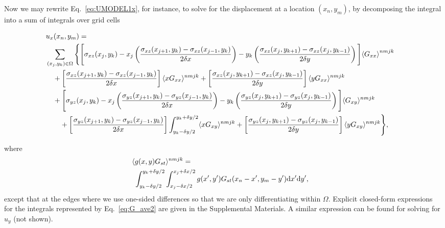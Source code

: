 \documentclass[aps,prl,reprint,twocolumn,groupedaddress,showpacs]{revtex4-1}
\def\dd{\mbox{d}}
\begin{document}
Now we may rewrite Eq.~\ref{eq:UMODEL1x}, for instance, to solve for the displacement at a location $(x_n,y_m)$, by decomposing the integral into a sum of integrals over grid cells
%
\begin{widetext}
\begin{align}
 \lefteqn{u_x(x_n,y_m) =} \nonumber\\
 & \sum_{(x_j,y_k)\in\Omega} \Bigg\{ \Bigg[\sigma_{xz}(x_j,y_k)  - x_j\left(\frac{\sigma_{xz}(x_{j+1},y_k) - \sigma_{xz}(x_{j-1},y_k) }{2\delta x }    \right)    -y_k\left( \frac{\sigma_{xz}(x_j,y_{k+1}) -  \sigma_{xz}(x_j,y_{k-1}) }{2\delta y}\right) \Bigg]{ \langle G_{xx} \rangle}^{nmjk} \nonumber \\
&\quad+\left[ \frac{\sigma_{xz}(x_{j+1},y_k) -  \sigma_{xz}(x_{j-1},y_k) }{2\delta x}   \right]\langle xG_{xx} \rangle^{nmjk} + \left[  \frac{\sigma_{xz}(x_j,y_{k+1}) - \sigma_{xz}(x_j,y_{k-1}) }{2\delta y} \right] \langle yG_{xx} \rangle^{nmjk}\nonumber\\
&\quad+  \Bigg[\sigma_{yz}(x_j,y_k) -x_j\left(\frac{\sigma_{yz}(x_{j+1},y_k) - \sigma_{yz}(x_{j-1},y_k) }{2\delta x}    \right)    -y_k\left( \frac{\sigma_{yz}(x_j,y_{k+1}) - \sigma_{yz}(x_j,y_{k-1}) }{2\delta y}\right) \Bigg] \langle G_{xy} \rangle^{nmjk}\nonumber \\
&\qquad +\left[ \frac{\sigma_{yz}(x_{j+1},y_k) -  \sigma_{yz}(x_{j-1},y_k) }{2\delta x}   \right]  \int_{y_k-\delta y/2}^{y_k+\delta y/2}  \langle xG_{xy} \rangle^{nmjk} + \left[  \frac{\sigma_{yz}(x_j,y_{k+1}) - \sigma_{yz}(x_j,y_{k-1}) }{2\delta y} \right] \langle yG_{xy} \rangle^{nmjk} \Bigg\},
\label{eq:ux_decomposed}
\end{align}
\end{widetext}
where
\begin{align}
\lefteqn{\langle g(x,y)G_{st} \rangle^{nmjk} =}  \nonumber\\
&\  \int_{y_k-\delta y/2}^{y_k+\delta y/2} \int_{x_j-\delta x/2}^{x_j+\delta x/2} g(x',y')G_{st}(x_n-x',y_m-y') \dd x' \dd y', \label{eq:G_ave} 
\end{align}
except that at the edges where we use one-sided differences so that we are only differentiating within $\Omega$. Explicit 
closed-form expressions for the integrals represented by Eq.~\ref{eq:G_ave2} are given in the Supplemental Materials. A similar expression can be found for solving for $u_y$ (not shown).
\end{document}
